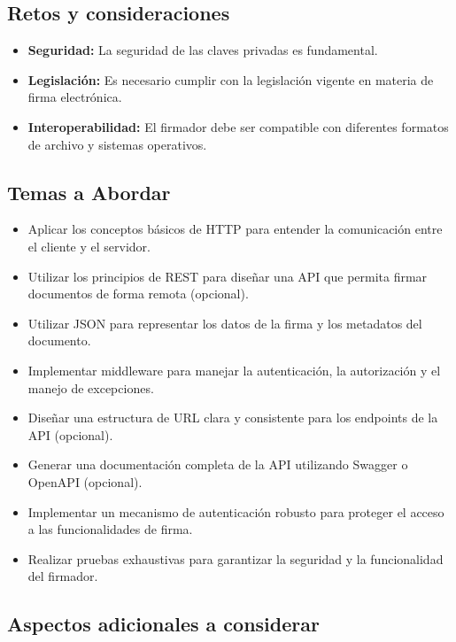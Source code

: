 \documentclass[
]{agujournal2019}
\begin{document}
\subsection{Retos y consideraciones}\label{retos-y-consideraciones}

\begin{itemize}
\item
  \textbf{Seguridad:} La seguridad de las claves privadas es
  fundamental.
\item
  \textbf{Legislación:} Es necesario cumplir con la legislación vigente
  en materia de firma electrónica.
\item
  \textbf{Interoperabilidad:} El firmador debe ser compatible con
  diferentes formatos de archivo y sistemas operativos.
\end{itemize}

\subsection{Temas a Abordar}\label{temas-a-abordar-2}

\begin{itemize}
\item
  Aplicar los conceptos básicos de HTTP para entender la comunicación
  entre el cliente y el servidor.
\item
  Utilizar los principios de REST para diseñar una API que permita
  firmar documentos de forma remota (opcional).
\item
  Utilizar JSON para representar los datos de la firma y los metadatos
  del documento.
\item
  Implementar middleware para manejar la autenticación, la autorización
  y el manejo de excepciones.
\item
  Diseñar una estructura de URL clara y consistente para los endpoints
  de la API (opcional).
\item
  Generar una documentación completa de la API utilizando Swagger o
  OpenAPI (opcional).
\item
  Implementar un mecanismo de autenticación robusto para proteger el
  acceso a las funcionalidades de firma.
\item
  Realizar pruebas exhaustivas para garantizar la seguridad y la
  funcionalidad del firmador.
\end{itemize}

\subsection{Aspectos adicionales a
considerar}\label{aspectos-adicionales-a-considerar}
\end{document}
